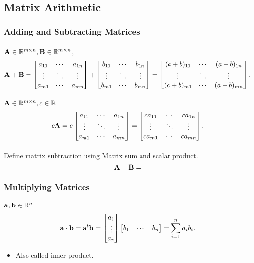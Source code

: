 \documentclass[../../main.tex]{subfiles}
\begin{document}


\subsection{Matrix Arithmetic}

\subsubsection{Adding and Subtracting Matrices}
\paragraph{ }
$\bA \in \fR^{m \times n}, \bB \in \fR^{m \times n}$, 
\begin{equation*}
    \bA + \bB = \printmatsq{a} + \printmatsq{b} = \printmatsq{(a+b)}.
\end{equation*}

\paragraph{ }
$\bA \in \fR^{m \times n}, c \in \fR$ 
\begin{equation*}
    c\bA = c \printmatsq{a} = \printmatsq{c a}.
\end{equation*}

\paragraph{ }
Define matrix subtraction using Matrix sum and scalar product. 
\begin{equation*}
    \bA - \bB = 
\end{equation*}



\subsubsection{Multiplying Matrices}

\paragraph{ }
$\ba, \bb \in \fR^{n}$
\begin{equation}
    \ba  \cdot \bb = \ba^t \bb = \printcolvec{a} \printrowvec{b} = \sum_{i=1}^{n} a_{i} b_{i}.
\end{equation}
\begin{itemize}
    \item Also called inner product.
\end{itemize}
\end{document}
